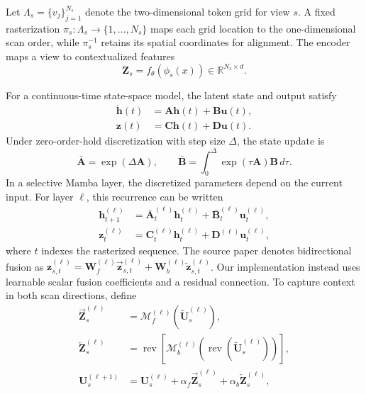 \documentclass[conference]{IEEEtran}
\begin{document}
Let $\Lambda_s=\{v_j\}_{j=1}^{N_s}$ denote the two-dimensional token grid for view $s$. A fixed rasterization $\pi_s:\Lambda_s\rightarrow\{1,\ldots,N_s\}$ maps each grid location to the one-dimensional scan order, while $\pi_s^{-1}$ retains its spatial coordinates for alignment. The encoder maps a view to contextualized features
\begin{equation}
    \mathbf{Z}_s=f_{\theta}(\phi_s(x))\in\mathbb{R}^{N_s\times d}.
    \label{eq:view-tokens}
\end{equation}

For a continuous-time state-space model, the latent state and output satisfy
\begin{align}
    \dot{\mathbf{h}}(t) &= \mathbf{A}\mathbf{h}(t)+\mathbf{B}\mathbf{u}(t),\\
    \mathbf{z}(t) &= \mathbf{C}\mathbf{h}(t)+\mathbf{D}\mathbf{u}(t).
    \label{eq:ssm-continuous}
\end{align}
Under zero-order-hold discretization with step size $\Delta$, the state update is
\begin{equation}
    \bar{\mathbf{A}}=\exp(\Delta\mathbf{A}),\qquad
    \bar{\mathbf{B}}=\int_{0}^{\Delta}\exp(\tau\mathbf{A})\mathbf{B}\,d\tau.
    \label{eq:ssm-discretization}
\end{equation}
In a selective Mamba layer, the discretized parameters depend on the current input. For layer $\ell$, this recurrence can be written
\begin{align}
    \mathbf{h}^{(\ell)}_{t+1} &= \bar{\mathbf{A}}^{(\ell)}_t\mathbf{h}^{(\ell)}_t+\bar{\mathbf{B}}^{(\ell)}_t\mathbf{u}^{(\ell)}_t,\\
    \mathbf{z}^{(\ell)}_t &= \mathbf{C}^{(\ell)}_t\mathbf{h}^{(\ell)}_t+\mathbf{D}^{(\ell)}\mathbf{u}^{(\ell)}_t,
    \label{eq:ssm-selective}
\end{align}
where $t$ indexes the rasterized sequence. The source paper denotes bidirectional fusion as $\mathbf{z}_{s,t}^{(\ell)}=\mathbf{W}^{(\ell)}_f\overrightarrow{\mathbf{z}}_{s,t}^{(\ell)}+\mathbf{W}^{(\ell)}_b\overleftarrow{\mathbf{z}}_{s,t}^{(\ell)}$. Our implementation instead uses learnable scalar fusion coefficients and a residual connection. To capture context in both scan directions, define
\begin{align}
    \overrightarrow{\mathbf{Z}}_s^{(\ell)} &= \mathcal{M}^{(\ell)}_f\!\left(\widetilde{\mathbf{U}}_s^{(\ell)}\right),\\
    \overleftarrow{\mathbf{Z}}_s^{(\ell)} &= \operatorname{rev}\!\left[\mathcal{M}^{(\ell)}_b\!\left(\operatorname{rev}(\widetilde{\mathbf{U}}_s^{(\ell)})\right)\right],\\
    \mathbf{U}_s^{(\ell+1)} &= \mathbf{U}_s^{(\ell)}+\alpha_f\overrightarrow{\mathbf{Z}}_s^{(\ell)}+\alpha_b\overleftarrow{\mathbf{Z}}_s^{(\ell)},
    \label{eq:bimamba}
\end{align}
\end{document}
